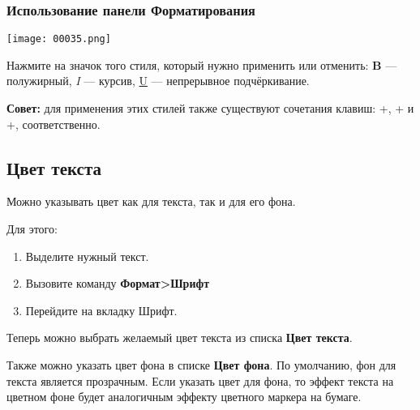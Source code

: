 \documentclass[a4paper,10pt]{article}
\begin{document}
\subsubsection{Использование панели Форматирования}

\texttt{[image: 00035.png]}

Нажмите на значок того стиля, который нужно применить или отменить: \textbf{B} — полужирный, \textit{I} — курсив, \underline{U} — непрерывное подчёркивание.

\begin{mdframed}[backgroundcolor=blue!10]
\textbf{Совет:} для применения этих стилей также существуют сочетания клавиш: +, + и +, соответственно.
\end{mdframed}

\subsection{Цвет текста}
Можно указывать цвет как для текста, так и для его фона.

Для этого:
\begin{enumerate}
 \item Выделите нужный текст.
 \item Вызовите команду \textbf{Формат>Шрифт}
 \item Перейдите на вкладку Шрифт.
\end{enumerate}

Теперь можно выбрать желаемый цвет текста из списка \textbf{Цвет текста}.

Также можно указать цвет фона в списке \textbf{Цвет фона}. По умолчанию, фон для текста является прозрачным. Если указать цвет для фона, то эффект текста на цветном фоне будет аналогичным эффекту цветного маркера на бумаге.
\end{document}

